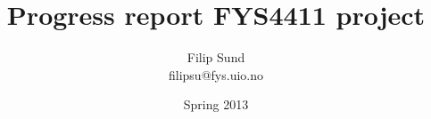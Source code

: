 \documentclass[a4paper,10pt]{article}
\title{Progress report FYS4411 project}
\author{Filip Sund \\ filipsu@fys.uio.no}
\date{Spring 2013}
\begin{document}
\maketitle{}


% 
%
\end{document}
